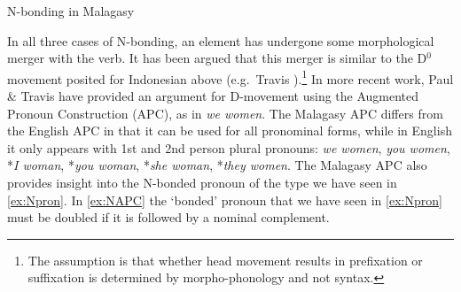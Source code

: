 \documentclass[output=paper,colorlinks,citecolor=brown,
]{langscibook}
\begin{document}
\ea N-bonding in Malagasy
\z
\z

In all three cases of N-bonding, an element has undergone some morphological merger with the verb. It has been argued that this merger is similar to the D$^0$ movement posited for Indonesian above (e.g.\ Travis \citeyear{Travis:2006}).\footnote{The assumption is that whether head movement results in prefixation or suffixation is determined by morpho-phonology and not syntax.}  In more recent work, Paul \& Travis \citeyearpar{Paul:2019} have provided an argument for D-movement using the Augmented Pronoun Construction (APC), as in \textit{we women}.  The Malagasy APC differs from the English APC in that it can be used for all pronominal forms, while in English it only appears with 1st and 2nd person plural pronouns: \textit{we women}, \textit{you women}, *\textit{I woman}, *\textit{you woman}, *\textit{she woman}, *\textit{they women}.  The Malagasy APC also provides insight into the N-bonded pronoun of the type we have seen in \ref{ex:Npron}.  In \ref{ex:NAPC} the 	`bonded' pronoun that we have seen in \ref{ex:Npron} must be doubled if it is followed by a nominal complement.

\z
\end{document}
